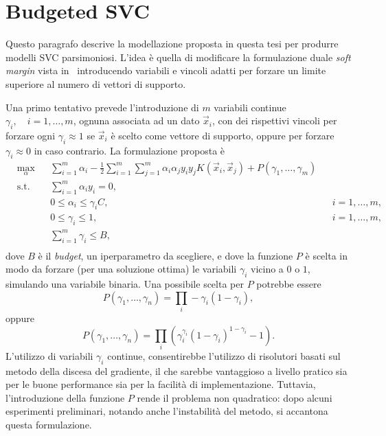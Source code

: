 \section{Budgeted SVC}\label{sec:our_budgeted_svm}
Questo paragrafo descrive la modellazione proposta in questa tesi per produrre modelli SVC parsimoniosi.
L'idea è quella di modificare la formulazione duale \emph{soft margin} vista in~ introducendo variabili e vincoli adatti per forzare un limite superiore al numero di vettori di supporto.

Una primo tentativo prevede l'introduzione di $m$ variabili continue $\gamma_i,\quad i=1,\dots,m$, ognuna associata ad un dato $\Vec{x}_i$, con dei rispettivi vincoli per forzare ogni $\gamma_i\approx1$ se $\Vec{x}_i$ è scelto come vettore di supporto, oppure per forzare $\gamma_i\approx0$ in caso contrario.
La formulazione proposta è 
\begin{equation}\label{eq:budget_svc:continuous_gamma_formulation}
\begin{aligned}
& \max_{\alpha}    && \sum_{i=1}^{m}\alpha_i - \frac{1}{2}\sum_{i=1}^{m}\sum_{j=1}^{m}\alpha_i\alpha_jy_iy_jK(\Vec{x}_i, \Vec{x}_j) +P(\gamma_1, \dots, \gamma_m)\\
& \textrm{s.t.} && \sum_{i=1}^{m} \alpha_iy_i = 0,                   \\
&               && 0 \leq \alpha_i \leq \gamma_iC,   && i=1,\dots,m,  \\
&               && 0 \leq \gamma_i \leq 1,           && i=1, \dots,m,\\
&               && \sum_{i=1}^{m} \gamma_i \leq B,                   \\
\end{aligned}
\end{equation}
dove $B$ è il \emph{budget}, un iperparametro da scegliere, e dove la funzione $P$ è scelta in modo da forzare (per una soluzione ottima) le variabili $\gamma_i$ vicino a $0$ o $1$, simulando una variabile binaria.
Una possibile scelta per $P$ potrebbe essere 
$$P(\gamma_1, \dots, \gamma_n) = \prod_i -\gamma_i (1 - \gamma_i),$$
oppure 
$$P(\gamma_1, \dots, \gamma_n) = \prod_i \left( \gamma_i^{\gamma_i} (1 - \gamma_i)^{1 - \gamma_i} - 1 \right).$$
%
%
L'utilizzo di variabili $\gamma_i$ continue, consentirebbe l'utilizzo di risolutori basati sul metodo della discesa del gradiente, il che sarebbe vantaggioso a livello pratico sia per le buone performance sia per la facilità di implementazione. 
Tuttavia, l'introduzione della funzione $P$ rende il problema non quadratico: dopo alcuni esperimenti preliminari, notando anche l'instabilità del metodo, si accantona questa formulazione.


